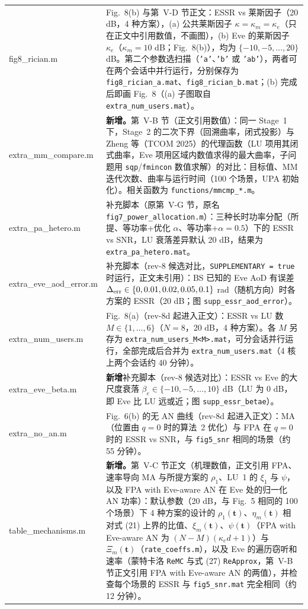 \documentclass[11pt,a4paper]{ctexart}
\newcommand{\code}[1]{\texttt{#1}}
\begin{document}
\begin{longtable}{>{\ttfamily\small}p{4.6cm}p{11.2cm}}
fig8\_rician.m & Fig.~8(b) 与第~V-D 节正文：ESSR vs 莱斯因子（20 dB，4 种方案），(a) 公共莱斯因子 $\kappa=\kappa_m=\kappa_e$（只在正文中引用数值，不画图），(b) Eve 的莱斯因子 $\kappa_e$（$\kappa_m=10$ dB；Fig.~8(b)），均为 $\{-10,-5,\ldots,20\}$ dB。第二个参数选扫描（\code{'a'}、\code{'b'} 或 \code{'ab'}），两者可在两个会话中并行运行，分别保存为 \code{fig8\_rician\_a.mat}、\code{fig8\_rician\_b.mat}；(b) 完成后即画 Fig.~8（(a) 子图取自 \code{extra\_num\_users.mat}）。\\
extra\_mm\_compare.m & \textbf{新增。}第~V-B 节（正文引用数值）：同一 Stage~1 下，Stage~2 的二次下界（回溯曲率，闭式投影）与 Zheng 等（TCOM 2025）的代理函数（LU 项用其闭式曲率，Eve 项用区域内数值求得的最大曲率，子问题用 \code{sqp}/\code{fmincon} 数值求解）的对比：目标值、MM 迭代次数、曲率与运行时间（100 个场景，UPA 初始化）。相关函数为 \code{functions/mmcmp\_*.m}。\\
extra\_pa\_hetero.m & 补充脚本（原第~V-G 节，原名 \code{fig7\_power\_allocation.m}）：三种长时功率分配（所提、等功率+优化 $\alpha$、等功率+$\alpha=0.5$）下的 ESSR vs SNR，LU 衰落差异默认 20 dB，结果为 \code{extra\_pa\_hetero.mat}。\\ \midrule
extra\_eve\_aod\_error.m & 补充脚本（rev-8 候选对比，\code{SUPPLEMENTARY = true} 时运行，正文未引用）：BS 已知的 Eve AoD 有误差 $\Delta_{\rm err}\in\{0,0.01,0.02,0.05,0.1\}$ rad（随机方向）时各方案的 ESSR（20 dB；图 \code{supp\_essr\_aod\_error}）。\\
extra\_num\_users.m & Fig.~8(a)（rev-8d 起进入正文）：ESSR vs LU 数 $M\in\{1,\ldots,6\}$（$N=8$，20 dB，4 种方案）。各 $M$ 另存为 \code{extra\_num\_users\_M<M>.mat}，可分会话并行运行，全部完成后合并为 \code{extra\_num\_users.mat}（4 核上两个会话约 40 分钟）。\\
extra\_eve\_beta.m & \textbf{新增}补充脚本（rev-8 候选对比）：ESSR vs Eve 的大尺度衰落 $\beta_e\in\{-10,-5,\ldots,10\}$ dB（LU 为 0 dB，即 Eve 比 LU 远或近；图 \code{supp\_essr\_betae}）。\\
extra\_no\_an.m & Fig.~6(b) 的无 AN 曲线（rev-8d 起进入正文）：MA（位置由 $q=0$ 时的算法~2 优化）与 FPA 在 $q=0$ 时的 ESSR vs SNR，与 \code{fig5\_snr} 相同的场景（约 55 分钟）。\\
table\_mechanisms.m & \textbf{新增。}第~V-C 节正文（机理数值，正文引用 FPA、速率导向 MA 与所提方案的 $\rho_1$、LU~1 的 $\xi_1$ 与 $\psi$，以及 FPA with Eve-aware AN 在 Eve 处的归一化 AN 功率）：默认参数（20 dB，与 Fig.~5 相同的 100 个场景）下 4 种方案的设计的 $\rho_1(\mathbf t)$、$\eta_m(\mathbf t)$ 相对式 (21) 上界的比值、$\xi_m(\mathbf t)$、$\psi(\mathbf t)$（FPA with Eve-aware AN 为 $(N-M)(\kappa_e d+1)$）与 $\Xi_m(\mathbf t)$（\code{rate\_coeffs.m}），以及 Eve 的遍历窃听和速率（蒙特卡洛 \code{ReMC} 与式 (27) \code{ReApprox}，第~V-B 节正文引用 FPA with Eve-aware AN 的两值），并检查每个场景的 ESSR 与 \code{fig5\_snr.mat} 完全相同（约 12 分钟）。\\

\end{longtable}
\end{document}
